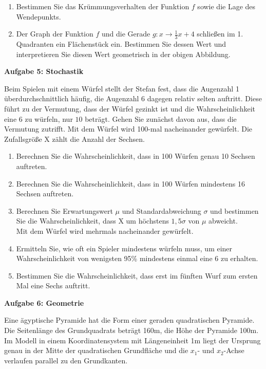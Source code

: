 \documentclass[a4paper,12pt]{article}
\newcommand{\Aufgabe}[1]{
  {
  \vspace*{0.5cm}
  \textsf{\textbf{Aufgabe #1}}
  \vspace*{0.2cm}
  
  }
}
\begin{document}
\begin{enumerate}[label={\alph*)}]
\item Bestimmen Sie das Krümmungsverhalten der Funktion $f$ sowie die Lage des Wendepunkts.\\
  \item Der Graph der Funktion $f$ und die Gerade $ g: x\rightarrow \frac{1}{3} x+4$ schließen im 1. Quadranten ein Flächenstück ein. Bestimmen Sie dessen Wert und interpretieren Sie diesen Wert geometrisch in der obigen Abbildung.
\end{enumerate}


\Aufgabe{5: Stochastik}
Beim Spielen mit einem Würfel stellt der Stefan fest, dass die Augenzahl 1 überdurchschnittlich häufig, die Augenzahl 6 dagegen relativ selten auftritt. Diese führt zu der Vermutung, dass der Würfel gezinkt ist und die Wahrscheinlichkeit eine 6 zu würfeln, nur $10$ beträgt. Gehen Sie zunächst davon aus, dass die Vermutung zutrifft.
Mit dem Würfel wird 100-mal nacheinander gewürfelt. Die Zufallsgröße X zählt die Anzahl der Sechsen.
\begin{enumerate}[label={\alph*)}]


\item Berechnen Sie die Wahrscheinlichkeit, dass in 100 Würfen genau 10 Sechsen auftreten.
\item Berechnen Sie die Wahrscheinlichkeit, dass in 100 Würfen mindestens 16 Sechsen auftreten.
\item Berechnen Sie Erwartungswert $\mu$ und Standardabweichung $\sigma$ und bestimmen Sie die Wahrscheinlichkeit, dass X um höchstens $1,5 \sigma$ von $ \mu$ abweicht.\\
Mit dem Würfel wird mehrmals nacheinander gewürfelt.
\item Ermitteln Sie, wie oft ein Spieler mindestens würfeln muss, um einer Wahrscheinlichkeit von wenigsten 95\% mindestens einmal eine 6 zu erhalten.
\item Bestimmen Sie die Wahrscheinlichkeit, dass erst im fünften Wurf zum ersten Mal eine Sechs auftritt.
\end{enumerate}


\newpage

\enlargethispage{2cm}
\Aufgabe{6: Geometrie}
Eine ägyptische Pyramide hat die Form einer geraden quadratischen Pyramide. Die Seitenlänge des Grundquadrats beträgt 160m, die Höhe der Pyramide 100m. Im Modell in einem Koordinatensystem mit Längeneinheit 1m liegt der Ursprung genau in der Mitte der quadratischen Grundfläche und die $x_1$- und $x_2$-Achse verlaufen parallel zu den Grundkanten. 
\end{document}
